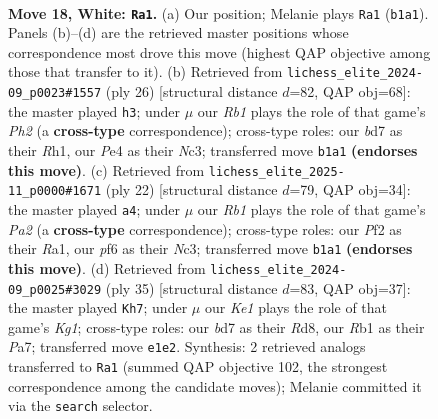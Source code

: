 \documentclass[11pt]{article}
\begin{document}
\begin{figure}[p]\centering
\begin{subfigure}{0.46\textwidth}\centering
\resizebox{\linewidth}{!}{%
\newchessgame
\chessboard[
  setfen={rn3r1b/pppb1k2/5pp1/4p2p/2P1P3/2N1BN2/PPB2PP1/1R2K1R1 w - - 6 18},
  showmover=false,
  pgfstyle=straightmove, color=movearrow, markmove={b1-a1}
]}
\caption{}
\end{subfigure}\hfill
\begin{subfigure}{0.46\textwidth}\centering
\resizebox{\linewidth}{!}{%
\newchessgame
\chessboard[
  setfen={r1k2bnr/pp3p2/2n1p2p/2p1P1p1/4P3/2N1BN2/PP3PPP/2KR3R w - - 0 14},
  showmover=false,
  pgfstyle=straightmove, color=movearrow, markmove={h2-h3}
]}
\caption{}
\end{subfigure}
\\[4pt]
\begin{subfigure}{0.46\textwidth}\centering
\resizebox{\linewidth}{!}{%
\newchessgame
\chessboard[
  setfen={r1br2k1/1pp2pbp/p4np1/4p3/4P3/2N1B2P/PPP1BPP1/R4RK1 w - - 0 12},
  showmover=false,
  pgfstyle=straightmove, color=movearrow, markmove={a2-a4}
]}
\caption{}
\end{subfigure}\hfill
\begin{subfigure}{0.46\textwidth}\centering
\resizebox{\linewidth}{!}{%
\newchessgame
\chessboard[
  setfen={3rr1k1/ppp2pp1/2b2n1p/8/P1P1p3/1P4N1/2P2PPP/R1B1K2R b - - 0 18},
  showmover=false,
  pgfstyle=straightmove, color=movearrow, markmove={g8-h7}
]}
\caption{}
\end{subfigure}
\caption{\textbf{Move 18, White: \texttt{Ra1}.} (a) Our position; Melanie plays \texttt{Ra1} (\texttt{b1a1}). Panels (b)--(d) are the retrieved master positions whose correspondence most drove this move (highest QAP objective among those that transfer to it). (b) Retrieved from \texttt{lichess\_elite\_2024-09\_p0023\#1557} (ply 26) [structural distance $d$=82, QAP obj=68]: the master played \texttt{h3}; under $\mu$ our \emph{Rb1} plays the role of that game's \emph{Ph2} (a \textbf{cross-type} correspondence); cross-type roles: our \emph{b}d7 as their \emph{R}h1, our \emph{P}e4 as their \emph{N}c3; transferred move \texttt{b1a1} \textbf{(endorses this move)}. (c) Retrieved from \texttt{lichess\_elite\_2025-11\_p0000\#1671} (ply 22) [structural distance $d$=79, QAP obj=34]: the master played \texttt{a4}; under $\mu$ our \emph{Rb1} plays the role of that game's \emph{Pa2} (a \textbf{cross-type} correspondence); cross-type roles: our \emph{P}f2 as their \emph{R}a1, our \emph{p}f6 as their \emph{N}c3; transferred move \texttt{b1a1} \textbf{(endorses this move)}. (d) Retrieved from \texttt{lichess\_elite\_2024-09\_p0025\#3029} (ply 35) [structural distance $d$=83, QAP obj=37]: the master played \texttt{Kh7}; under $\mu$ our \emph{Ke1} plays the role of that game's \emph{Kg1}; cross-type roles: our \emph{b}d7 as their \emph{R}d8, our \emph{R}b1 as their \emph{P}a7; transferred move \texttt{e1e2}. Synthesis: 2 retrieved analogs transferred to \texttt{Ra1} (summed QAP objective 102, the strongest correspondence among the candidate moves); Melanie committed it via the \texttt{search} selector.}
\label{fig:thought-m34}
\end{figure}
\end{document}
